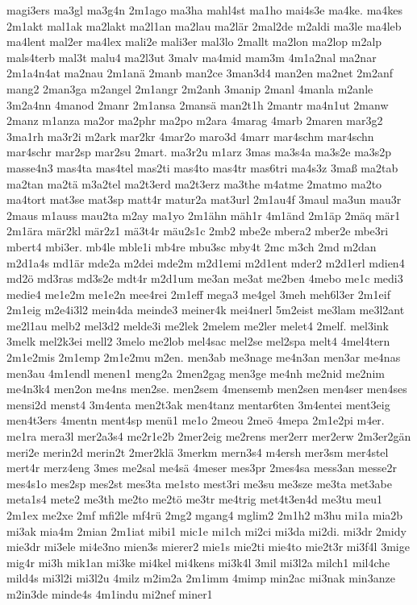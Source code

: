 {magi3ers
ma3gl
ma3g4n
2m1ago
ma3ha
mahl4st
ma1ho
mai4s3e
ma4ke.
ma4kes
2m1akt
mal1ak
ma2lakt
ma2l1an
ma2lau
ma2lär
2mal2de
m2aldi
ma3le
ma4leb
ma4lent
mal2er
ma4lex
mali2e
mali3er
mal3lo
2mallt
ma2lon
ma2lop
m2alp
mals4terb
mal3t
malu4
ma2l3ut
3malv
ma4mid
mam3m
4m1a2nal
ma2nar
2m1a4n4at
ma2nau
2m1anä
2manb
man2ce
3man3d4
man2en
ma2net
2m2anf
mang2
2man3ga
m2angel
2m1angr
2m2anh
3manip
2manl
4manla
m2anle
3m2a4nn
4manod
2manr
2m1ansa
2mansä
man2t1h
2mantr
ma4n1ut
2manw
2manz
m1anza
ma2or
ma2phr
ma2po
m2ara
4marag
4marb
2maren
mar3g2
3ma1rh
ma3r2i
m2ark
mar2kr
4mar2o
maro3d
4marr
mar4schm
mar4schn
mar4schr
mar2sp
mar2su
2mart.
ma3r2u
m1arz
3mas
ma3s4a
ma3s2e
ma3s2p
masse4n3
mas4ta
mas4tel
mas2ti
mas4to
mas4tr
mas6tri
ma4s3z
3maß
ma2tab
ma2tan
ma2tä
m3a2tel
ma2t3erd
ma2t3erz
ma3the
m4atme
2matmo
ma2to
ma4tort
mat3se
mat3sp
matt4r
matur2a
mat3url
2m1au4f
3maul
ma3un
mau3r
2maus
m1auss
mau2ta
m2ay
ma1yo
2m1ähn
mäh1r
4m1änd
2m1äp
2mäq
mär1
2m1ära
mär2kl
mär2z1
mä3t4r
mäu2s1c
2mb2
mbe2e
mbera2
mber2e
mbe3ri
mbert4
mbi3er.
mb4le
mble1i
mb4re
mbu3sc
mby4t
2mc
m3ch
2md
m2dan
m2d1a4s
md1är
mde2a
m2dei
mde2m
m2d1emi
m2d1ent
mder2
m2d1erl
mdien4
md2ö
md3ras
md3s2e
mdt4r
m2d1um
me3an
me3at
me2ben
4mebo
me1c
medi3
medie4
me1e2m
me1e2n
mee4rei
2m1eff
mega3
me4gel
3meh
meh6l3er
2m1eif
2m1eig
m2e4i3l2
mein4da
meinde3
meiner4k
mei4nerl
5m2eist
me3lam
me3l2ant
me2l1au
melb2
mel3d2
melde3i
me2lek
2melem
me2ler
melet4
2melf.
mel3ink
3melk
mel2k3ei
mell2
3melo
me2lob
mel4sac
mel2se
mel2spa
melt4
4mel4tern
2m1e2mis
2m1emp
2m1e2mu
m2en.
men3ab
me3nage
me4n3an
men3ar
me4nas
men3au
4m1endl
menen1
meng2a
2men2gag
men3ge
me4nh
me2nid
me2nim
me4n3k4
men2on
me4ns
men2se.
men2sem
4mensemb
men2sen
men4ser
men4ses
mensi2d
menst4
3m4enta
men2t3ak
men4tanz
mentar6ten
3m4entei
ment3eig
men4t3ers
4mentn
ment4sp
menü1
me1o
2meou
2meö
4mepa
2m1e2pi
m4er.
me1ra
mera3l
mer2a3s4
me2r1e2b
2mer2eig
me2rens
mer2err
mer2erw
2m3er2gän
meri2e
merin2d
merin2t
2mer2klä
3merkm
mern3s4
m4ersh
mer3sm
mer4stel
mert4r
merz4eng
3mes
me2sal
me4sä
4meser
mes3pr
2mes4sa
mess3an
messe2r
mes4s1o
mes2sp
mes2st
mes3ta
me1sto
mest3ri
me3su
me3sze
me3ta
met3abe
meta1s4
mete2
me3th
me2to
me2tö
me3tr
me4trig
met4t3en4d
me3tu
meu1
2m1ex
me2xe
2mf
mfi2le
mf4rü
2mg2
mgang4
mglim2
2m1h2
m3hu
mi1a
mia2b
mi3ak
mia4m
2mian
2m1iat
mibi1
mic1e
mi1ch
mi2ci
mi3da
mi2di.
mi3dr
2midy
mie3dr
mi3ele
mi4e3no
mien3s
mierer2
mie1s
mie2ti
mie4to
mie2t3r
mi3f4l
3mige
mig4r
mi3h
mik1an
mi3ke
mi4kel
mi4kens
mi3k4l
3mil
mi3l2a
milch1
mil4che
mild4s
mi3l2i
mi3l2u
4milz
m2im2a
2m1imm
4mimp
min2ac
mi3nak
min3anze
m2in3de
minde4s
4m1indu
mi2nef
miner1
}
